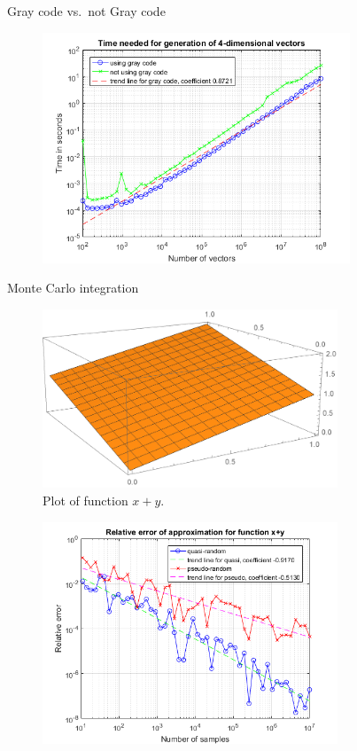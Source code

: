 \documentclass[11pt]{beamer}
\begin{document}
\begin{frame}{Gray code vs.~not Gray code}
    \begin{figure}
        \centering
        \includegraphics[width=260pt]{time.png}
    \end{figure}
\end{frame}

\begin{frame}{Monte Carlo integration}
    \begin{figure}
        \centering
        \includegraphics[width=250pt]{monte-carlo-xplusy.pdf}
        \caption{Plot of function $x+y$.}
    \end{figure}
\end{frame}

\begin{frame}
    \begin{figure}
        \centering
        \includegraphics[width=250pt]{monte-carlo-xplusy-error.png}
    \end{figure}
\end{frame}
\end{document}
